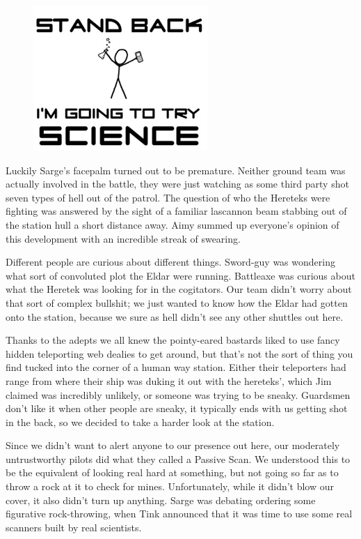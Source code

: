 \begin{figure}
	\begin{center}
		\includegraphics[width=\figwidth]{pics/11/46.png}
	\end{center}
\end{figure}
Luckily Sarge's facepalm turned out to be premature. 
Neither ground team was actually involved in the battle, they were just watching as some third party shot seven types of hell out of the patrol. 
The question of who the Hereteks were fighting was answered by the sight of a familiar lascannon beam stabbing out of the station hull a short distance away. 
Aimy summed up everyone's opinion of this development with an incredible streak of swearing.
 
Different people are curious about different things. 
Sword-guy was wondering what sort of convoluted plot the Eldar were running. 
Battleaxe was curious about what the Heretek was looking for in the cogitators. 
Our team didn't worry about that sort of complex bullshit; 
we just wanted to know how the Eldar had gotten onto the station, because we sure as hell didn't see any other shuttles out here.
 
Thanks to the adepts we all knew the pointy-eared bastards liked to use fancy hidden teleporting web dealies to get around, but that's not the sort of thing you find tucked into the corner of a human way station. 
Either their teleporters had range from where their ship was duking it out with the hereteks', which Jim claimed was incredibly unlikely, or someone was trying to be sneaky. 
Guardsmen don't like it when other people are sneaky, it typically ends with us getting shot in the back, so we decided to take a harder look at the station.
 
Since we didn't want to alert anyone to our presence out here, our moderately untrustworthy pilots did what they called a Passive Scan. 
We understood this to be the equivalent of looking real hard at something, but not going so far as to throw a rock at it to check for mines. 
Unfortunately, while it didn't blow our cover, it also didn't turn up anything. 
Sarge was debating ordering some figurative rock-throwing, when Tink announced that it was time to use some real scanners built by real scientists.

